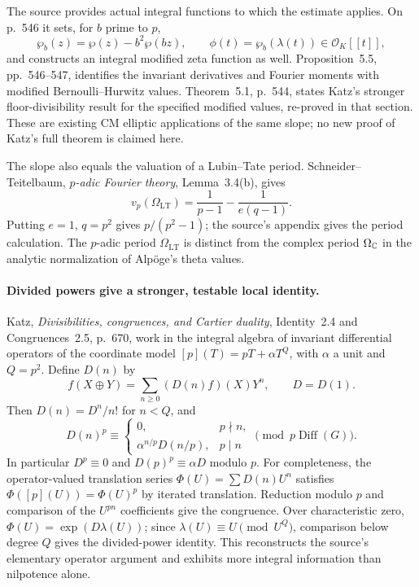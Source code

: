 \documentclass[11pt]{article}
\theoremstyle{definition}\newtheorem{definition}[theorem]{Definition}\newtheorem{remark}[theorem]{Remark}
\begin{document}
The source provides actual integral functions to which the estimate
applies. On p.~546 it sets, for $b$ prime to $p$,
\[
 \wp_b(z)=\wp(z)-b^2\wp(bz),\qquad
 \phi(t)=\wp_b(\lambda(t))\in\mathcal O_K[[t]],
\]
and constructs an integral modified zeta function as well.
Proposition~5.5, pp.~546--547, identifies the invariant derivatives
and Fourier moments with modified Bernoulli--Hurwitz values.
Theorem~5.1, p.~544, states Katz's stronger floor-divisibility
result for the specified modified values, re-proved in that section.
These are existing CM elliptic applications of the same slope; no
new proof of Katz's full theorem is claimed here.

The slope also equals the valuation of a Lubin--Tate period.
Schneider--Teitelbaum, \emph{$p$-adic Fourier theory},
Lemma~3.4(b), gives
\[
 v_p(\Omega_{\mathrm{LT}})=\frac1{p-1}-\frac1{e(q-1)}.
\]
Putting $e=1$, $q=p^2$ gives $p/(p^2-1)$; the source's appendix
gives the period calculation. The $p$-adic period
$\Omega_{\mathrm{LT}}$ is distinct from the complex period
$\Omega_{\mathbb C}$ in the analytic normalization of Alp\"oge's theta
values.

\paragraph{Divided powers give a stronger, testable local identity.}
Katz, \emph{Divisibilities, congruences, and Cartier duality},
Identity~2.4 and Congruences~2.5, p.~670, work in the integral
algebra of invariant differential operators of the coordinate model
$[p](T)=pT+\alpha T^{Q}$, with $\alpha$ a unit and $Q=p^2$.
Define $D(n)$ by
\[
 f(X\mathbin\oplus Y)=\sum_{n\geq0}(D(n)f)(X)Y^n,
 \qquad D=D(1).
\]
Then $D(n)=D^n/n!$ for $n<Q$, and
\[
 D(n)^p\equiv
 \begin{cases}
 0,&p\nmid n,\\
 \alpha^{n/p}D(n/p),&p\mid n
 \end{cases}
 \pmod{p\operatorname{Diff}(G)}.
\]
In particular $D^p\equiv0$ and $D(p)^p\equiv\alpha D$ modulo $p$.
For completeness, the operator-valued translation series
$\Phi(U)=\sum D(n)U^n$ satisfies
$\Phi([p](U))=\Phi(U)^p$ by iterated translation.
Reduction modulo $p$ and comparison of the $U^{pn}$ coefficients
give the congruence. Over characteristic zero,
$\Phi(U)=\exp(D\lambda(U))$; since
$\lambda(U)\equiv U\pmod{U^Q}$, comparison below degree $Q$
gives the divided-power identity. This reconstructs the source's
elementary operator argument and exhibits more integral information
than nilpotence alone.
\end{document}
